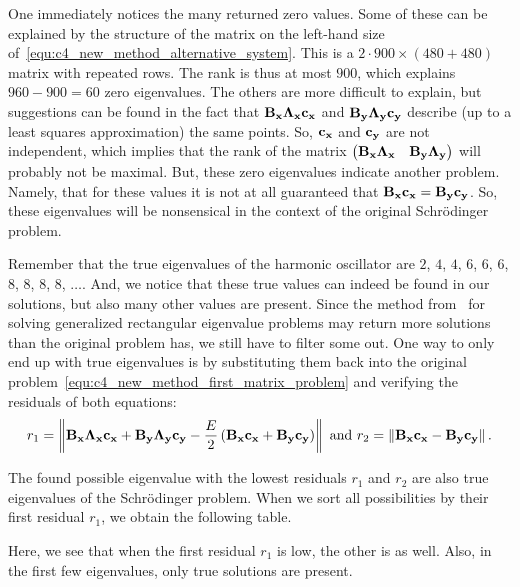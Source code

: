 One immediately notices the many returned zero values. Some of these can be explained by the structure of the matrix on the left-hand size of~\eqref{equ:c4_new_method_alternative_system}. This is a $2\cdot 900 \times (480 + 480)$ matrix with repeated rows. The rank is thus at most $900$, which explains $960 - 900 = 60$ zero eigenvalues. The others are more difficult to explain, but suggestions can be found in the fact that $\vb{B_x} \vb{\Lambda_x} \vb{c_x}$ and $\vb{B_y} \vb{\Lambda_y} \vb{c_y}$ describe (up to a least squares approximation) the same points. So, $\vb{c_x}$ and $\vb{c_y}$ are not independent, which implies that the rank of the matrix $\begin{pmatrix} \vb{B_x} \vb{\Lambda_x} & \vb{B_y} \vb{\Lambda_y}\end{pmatrix}$ will probably not be maximal. But, these zero eigenvalues indicate another problem. Namely, that for these values it is not at all guaranteed that $\vb{B_x} \vb{c_x} = \vb{B_y} \vb{c_y}$. So, these eigenvalues will be nonsensical in the context of the original Schrödinger problem.

Remember that the true eigenvalues of the harmonic oscillator are $2$, $4$, $4$, $6$, $6$, $6$, $8$, $8$, $8$, $8$, $\dots$. And, we notice that these true values can indeed be found in our solutions, but also many other values are present. Since the method from~\cite{hua_svd_1991} for solving generalized rectangular eigenvalue problems may return more solutions than the original problem has, we still have to filter some out. One way to only end up with true eigenvalues is by substituting them back into the original problem~\eqref{equ:c4_new_method_first_matrix_problem} and verifying the residuals of both equations:
$$
    r_1 = \left\| \vb{B_x} \vb{\Lambda_x} \vb{c_x} + \vb{B_y} \vb{\Lambda_y} \vb{c_y} - \frac{E}{2}\left(\vb{B_x}\vb{c_x} + \vb{B_y}\vb{c_y}\right) \right\| \text{ and } r_2=\left\| \vb{B_x} \vb{c_x} - \vb{B_y} \vb{c_y} \right\|\text{.}
$$

The found possible eigenvalue with the lowest residuals $r_1$ and $r_2$ are also true eigenvalues of the Schrödinger problem. When we sort all possibilities by their first residual $r_1$, we obtain the following table.
\begin{center}
    
\end{center}

Here, we see that when the first residual $r_1$ is low, the other is as well. Also, in the first few eigenvalues, only true solutions are present.


